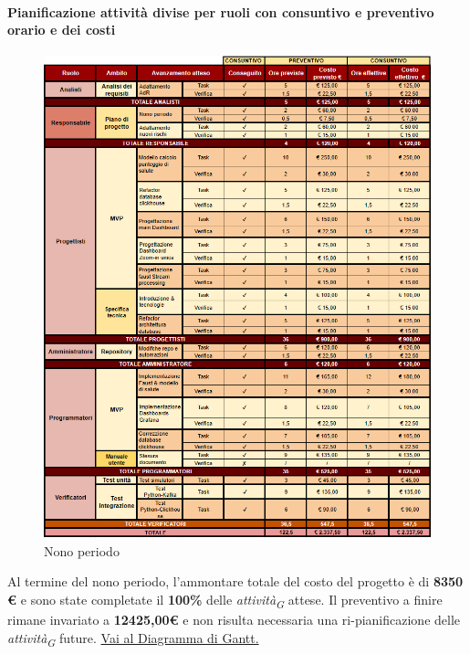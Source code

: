 \paragraph{Pianificazione attività divise per ruoli con consuntivo e preventivo orario e dei costi}

\vspace{0.4cm}

\begin{figure}[H]
    \centering
    \includegraphics[height=1.1\textwidth]{../Images/periodo9.PNG}
    \caption{Nono periodo}
    \label{fig:Nono_periodo}
\end{figure}

Al termine del nono periodo, l'ammontare totale del costo del progetto è di \textbf{8350 \euro} e sono state completate il \textbf{100\%} delle \textit{attività}\textsubscript{\textit{G}} attese.
Il preventivo a finire rimane invariato a \textbf{12425,00\euro} e non risulta necessaria una ri-pianificazione delle \textit{attività}\textsubscript{\textit{G}} future.
\href{https://github.com/orgs/ByteOps-swe/projects/3/views/1?sortedBy%5Bdirection%5D=asc&sortedBy%5BcolumnId%5D=64182560}{Vai al Diagramma di Gantt.}

